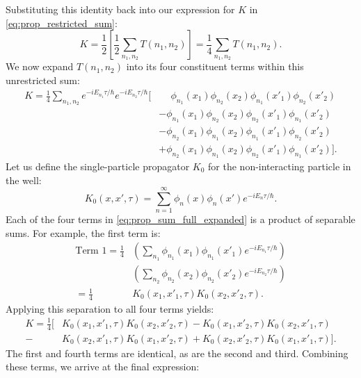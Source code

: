 Substituting this identity back into our expression for $K$
in \cref{eq:prop_restricted_sum}:
\begin{equation}
  K = \frac{1}{2} \left[ \frac{1}{2} \sum_{n_1, n_2} T(n_1, n_2) \right]
  = \frac{1}{4} \sum_{n_1, n_2} T(n_1, n_2).
\end{equation}
We now expand $T(n_1, n_2)$ into its four constituent terms within this
unrestricted sum:
\begin{align} \label{eq:prop_sum_full_expanded}
  K = \frac{1}{4} \sum_{n_1, n_2} e^{-iE_{n_1}\tau/\hbar} e^{-iE_{n_2}\tau/\hbar}
  \bigg[
      & \phantom{+} \phi_{n_1}(x_1)\phi_{n_2}(x_2)
      \phi_{n_1}(x'_1)\phi_{n_2}(x'_2) \nonumber \\
      & - \phi_{n_1}(x_1)\phi_{n_2}(x_2)
      \phi_{n_2}(x'_1)\phi_{n_1}(x'_2) \nonumber \\
      & - \phi_{n_2}(x_1)\phi_{n_1}(x_2)
      \phi_{n_1}(x'_1)\phi_{n_2}(x'_2) \nonumber \\
      & + \phi_{n_2}(x_1)\phi_{n_1}(x_2)
      \phi_{n_2}(x'_1)\phi_{n_1}(x'_2)
    \bigg].
\end{align}
Let us define the single-particle propagator $K_0$ for the
non-interacting particle in the well:
\begin{equation}
  K_0(x, x', \tau) = \sum_{n=1}^{\infty} \phi_n(x) \phi_n(x')
  e^{-iE_n\tau/\hbar}.
\end{equation}
Each of the four terms in \cref{eq:prop_sum_full_expanded} is a
product of separable sums. For example, the first term is:
\begin{align}
  \text{Term 1} = \frac{1}{4}
    & \left( \sum_{n_1} \phi_{n_1}(x_1)\phi_{n_1}(x'_1)
    e^{-iE_{n_1}\tau/\hbar} \right) \nonumber \\
    & \left( \sum_{n_2} \phi_{n_2}(x_2)\phi_{n_2}(x'_2)
    e^{-iE_{n_2}\tau/\hbar} \right) \nonumber \\
    = \frac{1}{4}
    & K_0(x_1, x'_1, \tau) K_0(x_2, x'_2, \tau).
\end{align}
Applying this separation to all four terms yields:
\begin{align}
  K = \frac{1}{4} \bigg[
      & K_0(x_1, x'_1, \tau) K_0(x_2, x'_2, \tau)
      - K_0(x_1, x'_2, \tau) K_0(x_2, x'_1, \tau) \nonumber \\
  - & K_0(x_2, x'_1, \tau) K_0(x_1, x'_2, \tau)
  + K_0(x_2, x'_2, \tau) K_0(x_1, x'_1, \tau)
\bigg].
\end{align}
The first and fourth terms are identical, as are the second and third.
Combining these terms, we arrive at the final expression:
